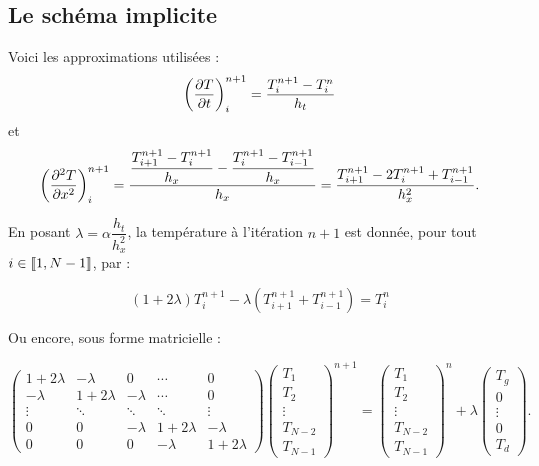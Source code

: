 \subsection{Le schéma implicite}

Voici les approximations utilisées :
$$\left(\dfrac{\partial T}{\partial t}\right)_i^{n+1}=\dfrac{T_i^{n+1}-T_i^n}{h_t}$$
et
$$\left(\dfrac{\partial^2T}{\partial 
x^2}\right)_i^{n+1}=\dfrac{\dfrac{T_{i+1}^{n+1}-T_i^{n+1}}{h_x}-\dfrac{T_i^{n+1}-T_{i-1}^{n+1}}{h_x}}{h_x}=
\dfrac{T_{i+1}^{n+1}-2T_i^{n+1}+T_{i-1}^{n+1}}{h_x^2}.$$


En posant $\lambda = \alpha\dfrac{h_t}{h_x^2}$, la température à l'itération $n+1$ est donnée, pour tout 
$i\in\llbracket1,N-1\rrbracket$, par :

$$ (1+2\lambda)T_i^{n+1}- \lambda (T_{i+1}^{n+1}+T_{i-1}^{n+1}) = T_i^n$$


Ou encore, sous forme matricielle :

$$\begin{pmatrix}1+2\lambda & -\lambda 	& 0 		& \cdots 	& 0 \\
-\lambda 	& 1+2\lambda 	& -\lambda 	& \cdots 	& 0\\
\vdots		& \ddots 	& \ddots 	& \ddots 	& \vdots \\
0		& 0		& -\lambda 	& 1+2\lambda 	& -\lambda \\
0		& 0		& 0		& -\lambda 	& 1+2\lambda \end{pmatrix}
\begin{pmatrix} T_1\\T_2\\ \vdots \\T_{N-2}\\ T_{N-1} \end{pmatrix} ^{n+1} =
\begin{pmatrix} T_1\\T_2\\ \vdots \\T_{N-2}\\ T_{N-1} \end{pmatrix} ^{n} + \lambda \begin{pmatrix} T_g\\ 0\\ \vdots \\ 
0\\ T_d \end{pmatrix}.$$


